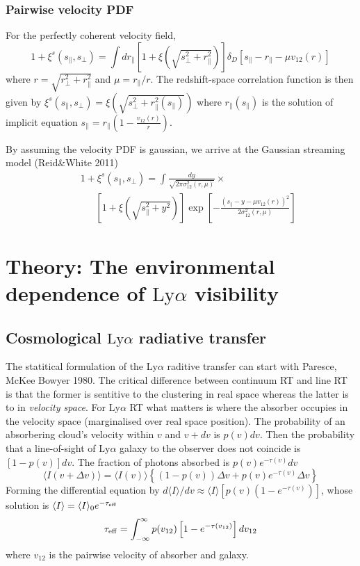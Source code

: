 \documentclass[useAMS,usenatbib,twocolumn]{mn2e}
\newcommand{\LyA}{\mbox{Ly}\alpha}
\begin{document}
\subsubsection{Pairwise velocity PDF}
For the perfectly coherent velocity field, 
\begin{equation}
1+\xi^s(s_\parallel,s_\perp)=\int dr_\parallel
\left[1+\xi(\sqrt{s^2_\perp+r_\parallel^2})\right]
\delta_D\left[s_\parallel-r_\parallel-\mu v_{12}(r)\right]
\end{equation}
where $r=\sqrt{r_\perp^2+r_\parallel^2}$ and $\mu=r_\parallel/r$. 
The redshift-space correlation function is then given by
$\xi^s(s_\parallel,s_\perp)=\xi(\sqrt{s^2_\perp+r_\parallel^2(s_\parallel)})$
where $r_\parallel(s_\parallel)$ is the solution of implicit equation
$s_\parallel=r_\parallel\left(1-\frac{v_{12}(r)}
{r}\right)$.

By assuming the velocity PDF is gaussian,
we arrive at the Gaussian streaming model (Reid\&White 2011)
\begin{eqnarray}
&&1+\xi^s(s_\parallel,s_\perp)=\int \frac{dy}{\sqrt{2\pi\sigma_{12}^2(r,\mu)}}\times
 \\
&&~~~~~~~\left[1+\xi(\sqrt{s^2_\parallel+y^2})\right]
\exp\left[-\frac{(s_\parallel-y-\mu v_{12}(r))^2}{2\sigma^2_{12}(r,\mu)}\right]
\nonumber
\end{eqnarray}




\section{Theory: The environmental dependence of $\LyA$ visibility}



\subsection{Cosmological $\LyA$ radiative transfer}
The statitical formulation of the $\LyA$ raditive transfer can start
with Paresce, McKee Bowyer 1980. The critical difference between continuum
RT and line RT is that the former is sentitive to the clustering in real
space whereas the latter is to in \textit{velocity space}. For $\LyA$ RT
what matters is where the absorber occupies in the velocity space (marginalised
over real space position).
The probability of an absorbering cloud's velocity within $v$ and $v+dv$
is $p(v)dv$. Then the probability that a line-of-sight of $\LyA$ galaxy to 
the observer does not coincide is $[1-p(v)]dv$. The fraction of photons absorbed
is $p(v)e^{-\tau(v)}dv$
\begin{equation}
\langle I(v+\Delta v)\rangle=\langle I(v)\rangle
\left\{
(1-p(v))\Delta v+p(v)e^{-\tau(v)}\Delta v
\right\}
\end{equation}
Forming the differential equation by $d\langle I\rangle/dv\approx
\langle I\rangle[p(v)(1-e^{-\tau(v)})]$, whose solution is
$\langle I\rangle=\langle I\rangle_0e^{-\tau_{\rm{eff}}}$
\begin{equation}
\tau_{\rm{eff}}=\int_{-\infty}^\infty p(v_{12})\left[1-e^{-\tau(v_{12})}\right]dv_{12}
\end{equation}
where $v_{12}$ is the pairwise velocity of absorber and galaxy.
\end{document}
